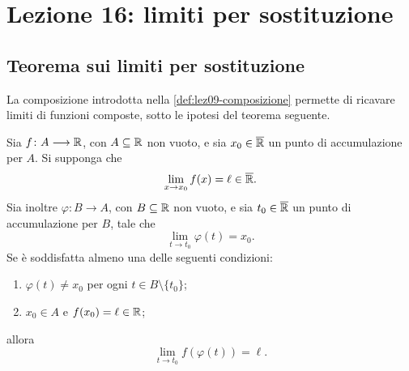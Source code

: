 \chapter[Lezione 16 --- 29 ottobre 2026]{Lezione 16: limiti per sostituzione}
\label{chap:lezione-16}

\section{Teorema sui limiti per sostituzione}
\label{sec:lez16-limiti-sostituzione}

La composizione introdotta nella \cref{def:lez09-composizione}
permette di ricavare limiti di funzioni composte,
sotto le ipotesi del teorema seguente.

\begin{theorem}
\label{thm:lez16-limite-sostituzione}
Sia \(f\colon A\longrightarrow\mathbb{R}\), con
\(A\subseteq\mathbb{R}\) non vuoto, e sia
\(x_0\in\overline{\mathbb{R}}\) un punto di accumulazione per \(A\).
Si supponga che
\[
  \lim_{x\to x_0}f(x)=\ell\in\overline{\mathbb{R}}.
\]
Sia inoltre \(\varphi\colon B\longrightarrow A\), con
\(B\subseteq\mathbb{R}\) non vuoto, e sia
\(t_0\in\overline{\mathbb{R}}\) un punto di accumulazione per \(B\),
tale che
\[
  \lim_{t\to t_0}\varphi(t)=x_0.
\]
Se è soddisfatta almeno una delle seguenti condizioni:
\begin{enumerate}
  \item \(\varphi(t)\ne x_0\) per ogni
  \(t\in B\setminus\{t_0\}\);
  \item \(x_0\in A\) e \(f(x_0)=\ell\in\mathbb{R}\);
\end{enumerate}
allora
\[
  \lim_{t\to t_0}f(\varphi(t))=\ell.
\]
\end{theorem}

